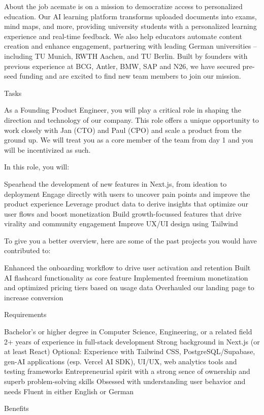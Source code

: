 About the job
acemate is on a mission to democratize access to personalized education. Our AI learning platform transforms uploaded documents into exams, mind maps, and more, providing university students with a personalized learning experience and real-time feedback. We also help educators automate content creation and enhance engagement, partnering with leading German universities – including TU Munich, RWTH Aachen, and TU Berlin. Built by founders with previous experience at BCG, Antler, BMW, SAP and N26, we have secured pre-seed funding and are excited to find new team members to join our mission.

Tasks

As a Founding Product Engineer, you will play a critical role in shaping the direction and technology of our company. This role offers a unique opportunity to work closely with Jan (CTO) and Paul (CPO) and scale a product from the ground up. We will treat you as a core member of the team from day 1 and you will be incentivized as such.

In this role, you will:

Spearhead the development of new features in Next.js, from ideation to deployment
Engage directly with users to uncover pain points and improve the product experience
Leverage product data to derive insights that optimize our user flows and boost monetization
Build growth-focussed features that drive virality and community engagement
Improve UX/UI design using Tailwind


To give you a better overview, here are some of the past projects you would have contributed to:

Enhanced the onboarding workflow to drive user activation and retention
Built AI flashcard functionality as core feature
Implemented freemium monetization and optimized pricing tiers based on usage data
Overhauled our landing page to increase conversion


Requirements

Bachelor’s or higher degree in Computer Science, Engineering, or a related field
2+ years of experience in full-stack development
Strong background in Next.js (or at least React)
Optional: Experience with Tailwind CSS, PostgreSQL/Supabase, gen-AI applications (esp. Vercel AI SDK), UI/UX, web analytics tools and testing frameworks
Entrepreneurial spirit with a strong sence of ownership and superb problem-solving skills
Obsessed with understanding user behavior and needs
Fluent in either English or German


Benefits

